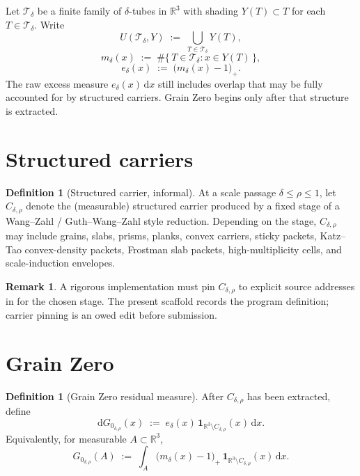 \documentclass[11pt]{amsart}
\theoremstyle{plain}
\theoremstyle{definition}
\newtheorem{definition}[theorem]{Definition}
\newtheorem{remark}[theorem]{Remark}
\newcommand{\dd}{\mathrm{d}}
\newcommand{\Gzero}{G_0}
\newcommand{\Cdr}{C_{\delta,\rho}}
\newcommand{\Tdelta}{\mathcal{T}_\delta}
\newcommand{\edelta}{e_\delta}
\newcommand{\mdelta}{m_\delta}
\begin{document}
Let $\Tdelta$ be a finite family of $\delta$-tubes in $\mathbb{R}^3$ with
shading $Y(T)\subset T$ for each $T\in\Tdelta$. Write
\begin{equation}
  U(\Tdelta,Y) \;:=\; \bigcup_{T\in\Tdelta} Y(T),
\end{equation}
\begin{equation}
  \mdelta(x) \;:=\; \#\{\,T\in\Tdelta : x\in Y(T)\,\},
\end{equation}
\begin{equation}
  \edelta(x) \;:=\; \bigl(\mdelta(x)-1\bigr)_+.
\end{equation}
The raw excess measure $\edelta(x)\,\dd x$ still includes overlap that may be
fully accounted for by structured carriers. Grain Zero begins only after that
structure is extracted.

\section{Structured carriers}

\begin{definition}[Structured carrier, informal]
\label{def:carrier}
At a scale passage $\delta\le \rho\le 1$, let $\Cdr$ denote the (measurable)
structured carrier produced by a fixed stage of a Wang--Zahl /
Guth--Wang--Zahl style reduction. Depending on the stage, $\Cdr$ may include
grains, slabs, prisms, planks, convex carriers, sticky packets, Katz--Tao
convex-density packets, Frostman slab packets, high-multiplicity cells, and
scale-induction envelopes.
\end{definition}

\begin{remark}
A rigorous implementation must pin $\Cdr$ to explicit source addresses in
\cite{WangZahl2025Kakeya,GuthWangZahl2026Streamlined} for the chosen stage.
The present scaffold records the program definition; carrier pinning is an
owed edit before submission.
\end{remark}

\section{Grain Zero}

\begin{definition}[Grain Zero residual measure]
\label{def:g0}
After $\Cdr$ has been extracted, define
\begin{equation}
  \dd \Gzero_{\delta,\rho}(x)
  \;:=\;
  \edelta(x)\, \mathbf{1}_{\mathbb{R}^3\setminus \Cdr}(x)\, \dd x.
\end{equation}
Equivalently, for measurable $A\subset\mathbb{R}^3$,
\begin{equation}
  \Gzero_{\delta,\rho}(A)
  \;:=\;
  \int_A \bigl(\mdelta(x)-1\bigr)_+
  \,\mathbf{1}_{\mathbb{R}^3\setminus \Cdr}(x)\, \dd x.
\end{equation}
\end{definition}
\end{document}
